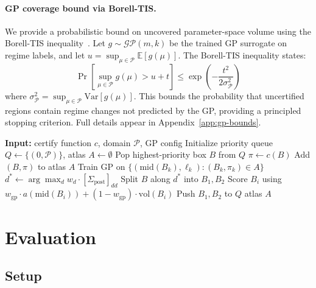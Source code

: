 \documentclass[11pt]{article}
\begin{document}
\paragraph{GP coverage bound via Borell-TIS.}
We provide a probabilistic bound on uncovered parameter-space volume using the Borell-TIS inequality~\cite{borell1975}.
Let $g \sim \mathcal{GP}(m, k)$ be the trained GP surrogate on regime labels, and let $u = \sup_{\mu \in \mathcal{P}} \mathbb{E}[g(\mu)]$.
The Borell-TIS inequality states:
\[
\Pr\!\left[\sup_{\mu \in \mathcal{P}} g(\mu) > u + t\right] \leq \exp\!\left(-\frac{t^2}{2\sigma_{\mathcal{P}}^2}\right)
\]
where $\sigma_{\mathcal{P}}^2 = \sup_{\mu \in \mathcal{P}} \mathrm{Var}[g(\mu)]$.
This bounds the probability that uncertified regions contain regime changes not predicted by the GP, providing a principled stopping criterion.
Full details appear in Appendix~\ref{app:gp-bounds}.

\begin{algorithm}[t]
\caption{GP-Guided Adaptive Refinement with Posterior-Informed Splitting}
\label{alg:gp-refine}
\begin{algorithmic}[1]
\State \textbf{Input:} certify function $c$, domain $\mathcal{P}$, GP config
\State Initialize priority queue $Q \leftarrow \{(0, \mathcal{P})\}$, atlas $A \leftarrow \emptyset$
  \State Pop highest-priority box $B$ from $Q$
  \State $\pi \leftarrow c(B)$ 
    \State Add $(B, \pi)$ to atlas $A$
      \State Train GP on $\{(\mathrm{mid}(B_k), \ell_k) : (B_k, \pi_k) \in A\}$
    \EndIf
  \Else
    \State $d^* \leftarrow \arg\max_d w_d \cdot [\Sigma_{\mathrm{post}}]_{dd}$ 
    \State Split $B$ along $d^*$ into $B_1, B_2$
    \State Score $B_i$ using $w_{\mathrm{gp}} \cdot a(\mathrm{mid}(B_i)) + (1 - w_{\mathrm{gp}}) \cdot \mathrm{vol}(B_i)$
    \State Push $B_1, B_2$ to $Q$
  \EndIf
\EndWhile
\State \Return atlas $A$
\end{algorithmic}
\end{algorithm}

\section{Evaluation}
\label{sec:eval}

\subsection{Setup}
\end{document}
